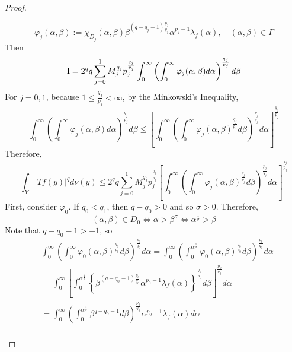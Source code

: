 \begin{proof}
\begin{enumerate}[label=(\Roman*)]
		\begin{equation*}
			\varphi_j(\alpha, \beta):=\chi_{D_j}(\alpha, \beta) \beta^{\left(q-q_j-1\right) \frac{p_j}{q_j}} \alpha^{p_j-1} \lambda_f(\alpha), \quad(\alpha, \beta) \in \Gamma
		\end{equation*}
		Then 
		\begin{equation*}
			\text{\RNum{1}} = 2^q q \sum_{j=0}^1 M_j^{q_j} p_j^{\frac{q_j}{p_j}} \int_0^{\infty}\left(\int_0^{\infty} \varphi_j(\alpha, \beta) d \alpha\right)^{\frac{q_j}{p_j}} d \beta
		\end{equation*}
		For $j = 0,1$, because $1 \leq \frac{q_j}{p_j} < \infty$, by the Minkowski's Inequality,
		\begin{equation*}
			\int_0^{\infty}\left(\int_0^{\infty} \varphi_j(\alpha, \beta) d \alpha\right)^{\frac{q_j}{p_j}} d \beta \leq\left[\int_0^{\infty}\left(\int_0^{\infty} \varphi_j(\alpha, \beta)^{\frac{q_j}{p_j}} d \beta\right)^{\frac{p_j}{q_j}} d \alpha\right]^{\frac{q_j}{p_j}}
		\end{equation*}
		Therefore, 
		\begin{equation*}
			\int_Y|T f(y)|^q d \nu(y) \leq 2^q q \sum_{j=0}^1 M_j^{q_j} p_j^{\frac{q_j}{p_j}}\left[\int_0^{\infty}\left(\int_0^{\infty} \varphi_j(\alpha, \beta)^{\frac{q_j}{p_j}} d \beta\right)^{\frac{p_j}{q_j}} d \alpha\right]^{\frac{q_j}{p_j}}
		\end{equation*}
		First, consider $\varphi_0$. If $q_0 < q_1$, then $q - q_0 > 0$ and so $\sigma > 0$. Therefore,
		\begin{equation*}
			(\alpha, \beta) \in D_0 \Longleftrightarrow \alpha>\beta^\sigma \Longleftrightarrow \alpha^{\frac{1}{\sigma}}>\beta
		\end{equation*}
		Note that $q-q_0-1>-1$, so
		\begin{equation*}
			\begin{aligned}
				& \int_0^{\infty}\left(\int_0^{\infty} \varphi_0(\alpha, \beta)^{\frac{q_0}{p_0}} d \beta\right)^{\frac{p_0}{q_0}} d \alpha=\int_0^{\infty}\left(\int_0^{\alpha^{\frac{1}{\sigma}}} \varphi_0(\alpha, \beta)^{\frac{q_0}{p_0}} d \beta\right)^{\frac{p_0}{q_0}} d \alpha \\
				& =\int_0^{\infty}\left[\int_0^{\alpha^{\frac{1}{\sigma}}}\left\{\beta^{\left(q-q_0-1\right) \frac{p_0}{q_0}} \alpha^{p_0-1} \lambda_f(\alpha)\right\}^{\frac{q_0}{p_0}} d \beta\right]^{\frac{p_0}{q_0}} d \alpha \\
				& =\int_0^{\infty}\left(\int_0^{\alpha^{\frac{1}{\sigma}}} \beta^{q-q_0-1} d \beta\right)^{\frac{p_0}{q_0}} \alpha^{p_0-1} \lambda_f(\alpha) d \alpha \\

\end{aligned}
\end{equation*}
\end{enumerate}
\end{proof}
